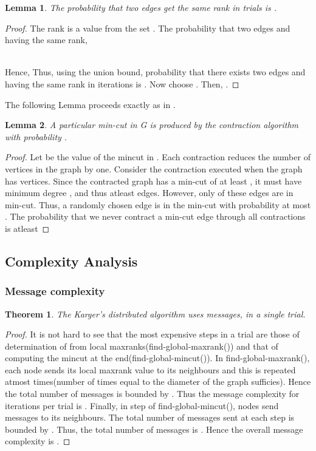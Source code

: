 \documentclass{acm_proc_article-sp}
\begin{document}
\newtheorem{mydef12}{Lemma}[subsection]
\begin{mydef12}
 The probability that two edges get the same rank in  trials is .
\end{mydef12}

\begin{proof}
The rank is a value from the set . The probability that two edges  and  having the same rank,

\\Hence, 
\newline
Thus, using the union bound, probability that there exists two edges  and  having the same rank in  iterations is
.
Now choose . Then, .
\end{proof}

The following Lemma proceeds exactly as in \cite{NRMM97}.
\newtheorem{mydef13}[mydef12]{Lemma}
\begin{mydef13}
 A particular min-cut in G is produced by the contraction algorithm with probability .
\end{mydef13}

\begin{proof}
Let  be the value of the mincut in . Each contraction reduces the number of vertices in the graph by one. Consider the contraction executed when the graph has  vertices. Since the contracted graph has a min-cut of at least , it must have minimum degree , and thus atleast  edges. However, only  of these edges are in min-cut. Thus, a randomly chosen edge is in the min-cut with probability at most . The probability that we never contract a min-cut edge through all  contractions is atleast

\end{proof}

\newpage

\subsection{Complexity Analysis}
\subsubsection{Message complexity}
\newtheorem{mydef14}{Theorem}[subsection]
\begin{mydef14}
 The Karger's distributed algorithm uses  messages, in a single trial.
\end{mydef14}

\begin{proof}
It is not hard to see that the most expensive steps in a trial are those of determination of  from local maxranks(find-global-maxrank()) and that of computing the mincut at the end(find-global-mincut()). In find-global-maxrank(), each node sends its local maxrank value to its neighbours and this is repeated atmost  times(number of times equal to the diameter of the graph sufficies). Hence the total number of messages is bounded by . Thus the message complexity for  iterations per trial is .  Finally, in step  of find-global-mincut(),  nodes send messages to its neighbours. The total number of messages sent at each step is bounded by . Thus, the total number of messages is .  Hence the overall message complexity is .
\end{proof}
\end{document}

